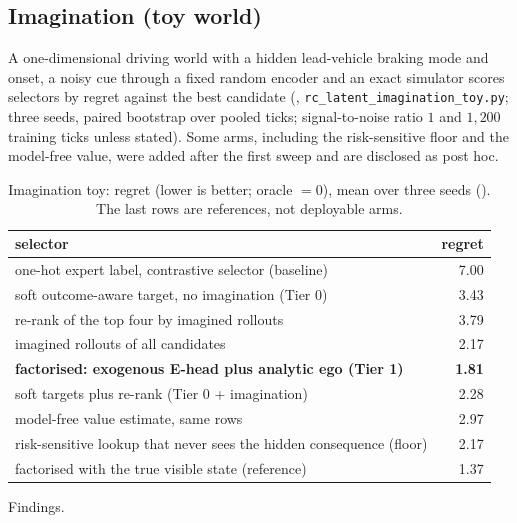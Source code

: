 \subsection{Imagination (toy world)}\label{sec:prelim-imag}
A one-dimensional driving world with a hidden lead-vehicle braking mode and onset, a noisy cue through a fixed random encoder and an exact simulator scores selectors by regret against the best candidate (\evM, \texttt{rc\_latent\_imagination\_toy.py}; three seeds, paired bootstrap over pooled ticks; signal-to-noise ratio $1$ and $1{,}200$ training ticks unless stated). Some arms, including the risk-sensitive floor and the model-free value, were added after the first sweep and are disclosed as post hoc.
\begin{table}[h]
\centering\small
\caption{Imagination toy: regret (lower is better; oracle $=0$), mean over three seeds (\evM). The last rows are references, not deployable arms.}
\label{tab:imag}
\begin{tabular}{@{}lr@{}}
\toprule
selector & regret \\ \midrule
one-hot expert label, contrastive selector (baseline) & 7.00 \\
soft outcome-aware target, no imagination (Tier 0) & 3.43 \\
re-rank of the top four by imagined rollouts & 3.79 \\
imagined rollouts of all candidates & 2.17 \\
\textbf{factorised: exogenous E-head plus analytic ego (Tier 1)} & \textbf{1.81} \\
soft targets plus re-rank (Tier 0 + imagination) & 2.28 \\
model-free value estimate, same rows & 2.97 \\
risk-sensitive lookup that never sees the hidden consequence (floor) & 2.17 \\
factorised with the true visible state (reference) & 1.37 \\
\bottomrule
\end{tabular}
\end{table}
Findings.
